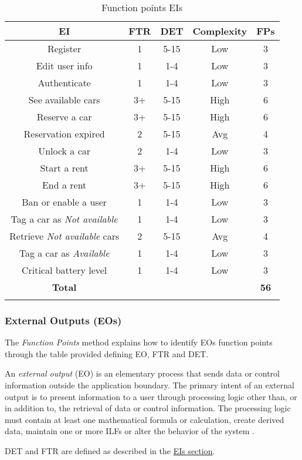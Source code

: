 \begin{longtable}{ccccc}
\toprule
\textbf{EI}	& FTR & DET & 	Complexity  & \textbf{FPs}\\
\midrule
Register & 1 & 5-15 &	Low & 3 \\
Edit user info & 1 & 1-4 &	Low & 3 \\
Authenticate &1 & 1-4 & Low & 3 \\
See available cars & 3+ & 5-15 & High & 6 \\
Reserve a car & 3+ & 5-15 & High & 6 \\
Reservation expired & 2 & 5-15 & Avg & 4 \\
Unlock a car & 2 & 1-4 &	Low & 3 \\
Start a rent & 3+ & 5-15 & High & 6 \\
End a rent & 3+ & 5-15 & High & 6 \\
Ban or enable a user & 1 & 1-4 &	Low & 3 \\
Tag a car as \emph{Not available} & 1 & 1-4 &	Low & 3 \\
Retrieve \emph{Not available} cars & 2 & 5-15 & Avg & 4\\
Tag a car as \emph{Available} & 1 & 1-4 &	Low & 3\\
Critical battery level & 1 & 1-4 &	Low & 3\\
\midrule
\textbf{Total} & & & &  \textbf{56}\\
\bottomrule 
\caption{Function points EIs}
\label{tbl:eiFP}
\end{longtable}


\subsubsection{External Outputs (EOs)} 

The \emph{Function Points} method explains how to identify EOs function points through the table provided defining EO, FTR and DET.

An \textit{external output} (EO) is an elementary process that sends data or control information outside the application boundary. The primary intent of an external output is to present information to a user through processing logic other than, or in addition to, the retrieval of data or control information. The processing logic must contain at least one mathematical formula or calculation, create derived data, maintain one or more ILFs or alter the behavior of the system \cite{FP}.

DET and FTR are defined as described in the \hyperref[sec:EIs]{EIs section}.\\

